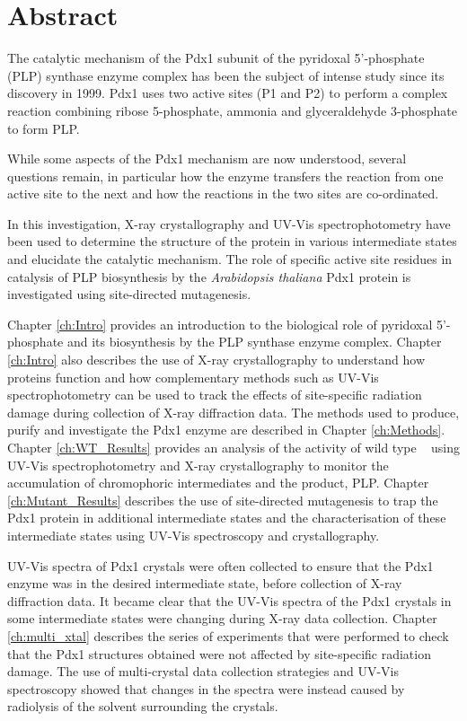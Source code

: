 \chapter*{Abstract}
The catalytic mechanism of the Pdx1 subunit of the pyridoxal 5'-phosphate (PLP) synthase enzyme complex has been the subject of intense study since its discovery in 1999. Pdx1 uses two active sites (P1 and P2) to perform a complex reaction combining ribose 5-phosphate, ammonia and glyceraldehyde 3-phosphate to form PLP. 

While some aspects of the Pdx1 mechanism are now understood, several questions remain, in particular how the enzyme transfers the reaction from one active site to the next and how the reactions in the two sites are co-ordinated. 

In this investigation, X-ray crystallography and UV-Vis spectrophotometry have been used to determine the structure of the protein in various intermediate states and elucidate the catalytic mechanism. The role of specific active site residues in catalysis of PLP biosynthesis by the \textit{Arabidopsis thaliana} Pdx1 protein is investigated using site-directed mutagenesis.   

Chapter \ref{ch:Intro} provides an introduction to the biological role of pyridoxal 5'-phosphate and its biosynthesis by the PLP synthase enzyme complex. Chapter \ref{ch:Intro} also describes the use of X-ray crystallography to understand how proteins function and how complementary methods such as UV-Vis spectrophotometry can be used to track the effects of site-specific radiation damage during collection of X-ray diffraction data. The methods used to produce, purify and investigate the Pdx1 enzyme are described in Chapter \ref{ch:Methods}. Chapter \ref{ch:WT_Results} provides an analysis of the activity of wild type \atpdx~ using UV-Vis spectrophotometry and X-ray crystallography to monitor the accumulation of chromophoric intermediates and the product, PLP. Chapter \ref{ch:Mutant_Results} describes the use of site-directed mutagenesis to trap the Pdx1 protein in additional intermediate states and the characterisation of these intermediate states using UV-Vis spectroscopy and crystallography.

UV-Vis spectra of Pdx1 crystals were often collected to ensure that the Pdx1 enzyme was in the desired intermediate state, before collection of X-ray diffraction data. It became clear that the UV-Vis spectra of the Pdx1 crystals in some intermediate states were changing during X-ray data collection. Chapter \ref{ch:multi_xtal} describes the series of experiments that were performed to check that the Pdx1 structures obtained were not affected by site-specific radiation damage. The use of multi-crystal data collection strategies and UV-Vis spectroscopy showed that changes in the spectra were instead caused by radiolysis of the solvent surrounding the crystals.\clearpage\null\newpage

